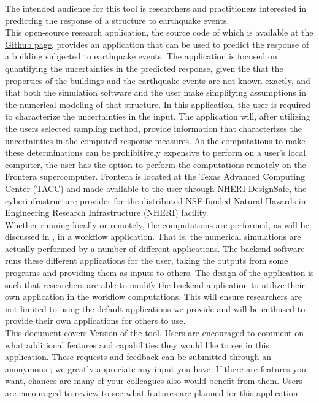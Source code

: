 The intended audience for this tool is researchers and practitioners
interested in predicting the response of a structure to earthquake
events.\\

This open-source research application, the source code of which is
available at
the \href{https://github.com/NHERI-SimCenter/EE-UQ}{\texttt{\getsoftwarename{}}
Github page}, provides an application that can be used to predict the
response of a building subjected to earthquake events. The application
is focused on quantifying the uncertainties in the predicted response,
given the that the properties of the buildings and the earthquake
events are not known exactly, and that both the simulation software
and the user make simplifying assumptions in the numerical modeling of
that structure. In this application, the user is required to
characterize the uncertainties in the input. The application will,
after utilizing the users selected sampling method, provide
information that characterizes the uncertainties in the computed
response measures. As the computations to make these determinations
can be prohibitively expensive to perform on a user's local computer,
the user has the option to perform the computations remotely on the
Frontera supercomputer. Frontera is located at the Texas Advanced
Computing Center (TACC) and made available to the user through NHERI
DesignSafe, the cyberinfrastructure provider for the distributed NSF
funded Natural Hazards in Engineering Research Infrastructure (NHERI)
facility.\\

Whether running locally or remotely, the computations are performed,
as will be discussed in , in a workflow
application. That is, the numerical simulations are actually performed
by a number of different applications. The \texttt{\getsoftwarename{}} backend software runs
these different applications for the user, taking the outputs from
some programs and providing them as inputs to others. The design of
the \texttt{\getsoftwarename{}} application is such that researchers are able to modify the
backend application to utilize their own application in the workflow
computations. This will ensure researchers are not limited to using
the default applications we provide and will be enthused to provide
their own applications for others to use. \\

This document covers Version \getsoftwareversion{} of the tool. Users are
encouraged to comment on what additional features and capabilities
they would like to see in this application. These requests and
feedback can be submitted through an anonymous ; we greatly appreciate any input you have. If there are
features you want, chances are many of your colleagues also would
benefit from them. Users are encouraged to review
 to see what features are planned for this
application.
